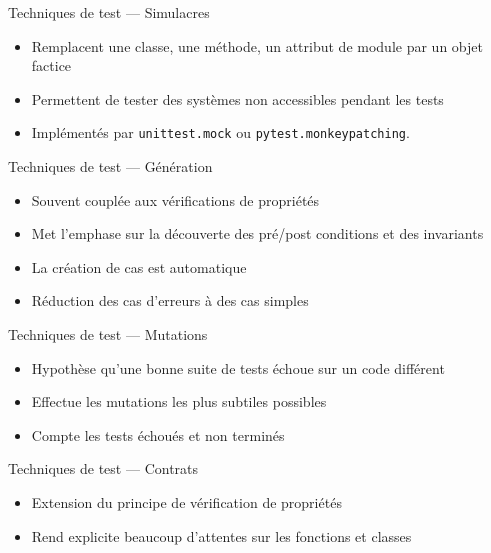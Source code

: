 \begin{frame}{Techniques de test --- Simulacres}
  \begin{itemize}[<+->]
    \item Remplacent une classe, une méthode, un attribut de module par un objet factice
    \item Permettent de tester des systèmes non accessibles pendant les tests
    \item Implémentés par \texttt{unittest.mock} ou \texttt{pytest.monkeypatching}.
  \end{itemize}

\end{frame}

\begin{frame}{Techniques de test --- Génération}
  \begin{itemize}[<+->]
    \item Souvent couplée aux vérifications de propriétés
    \item Met l'emphase sur la découverte des pré/post conditions et des invariants
    \item La création de cas est automatique
    \item Réduction des cas d'erreurs à des cas simples
  \end{itemize}
\end{frame}

\begin{frame}{Techniques de test --- Mutations}
  \begin{itemize}[<+->]
    \item Hypothèse qu'une bonne suite de tests échoue sur un code différent
    \item Effectue les mutations les plus subtiles possibles
    \item Compte les tests échoués et non terminés
  \end{itemize}
\end{frame}

\begin{frame}{Techniques de test --- Contrats}
  \begin{itemize}[<+->]
    \item Extension du principe de vérification de propriétés
    \item Rend explicite beaucoup d'attentes sur les fonctions et classes
  \end{itemize}

\end{frame}

